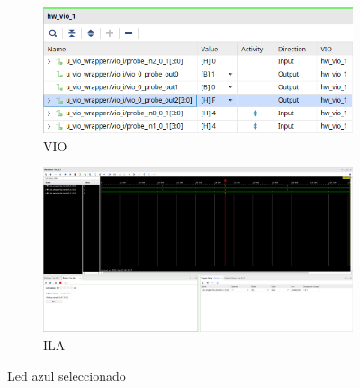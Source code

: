\begin{figure}[H]
    \centering
    \begin{subfigure}{0.5\textwidth}
        \includegraphics[width=\textwidth]{captures/impl_c2_led_blue_vio.png}
        \caption{VIO}
    \end{subfigure}

    \vspace{1cm}

    \begin{subfigure}{\textwidth}
        \includegraphics[width=\textwidth]{captures/impl_c2_led_blue_ila.png}
        \caption{ILA}
    \end{subfigure}

    \caption{Led azul seleccionado}
\end{figure}

\newpage

